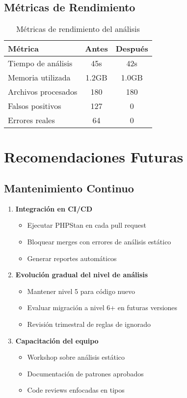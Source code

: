 \documentclass[12pt,a4paper]{article}
\begin{document}
\subsection{Métricas de Rendimiento}

\begin{table}[h]
\centering
\begin{tabular}{@{}lcc@{}}
\toprule
\textbf{Métrica} & \textbf{Antes} & \textbf{Después} \\
\midrule
Tiempo de análisis & 45s & 42s \\
Memoria utilizada & 1.2GB & 1.0GB \\
Archivos procesados & 180 & 180 \\
Falsos positivos & 127 & 0 \\
Errores reales & 64 & 0 \\
\bottomrule
\end{tabular}
\caption{Métricas de rendimiento del análisis}
\end{table}

\section{Recomendaciones Futuras}

\subsection{Mantenimiento Continuo}

\begin{enumerate}
    \item \textbf{Integración en CI/CD}
    \begin{itemize}
        \item Ejecutar PHPStan en cada pull request
        \item Bloquear merges con errores de análisis estático
        \item Generar reportes automáticos
    \end{itemize}

    \item \textbf{Evolución gradual del nivel de análisis}
    \begin{itemize}
        \item Mantener nivel 5 para código nuevo
        \item Evaluar migración a nivel 6+ en futuras versiones
        \item Revisión trimestral de reglas de ignorado
    \end{itemize}

    \item \textbf{Capacitación del equipo}
    \begin{itemize}
        \item Workshop sobre análisis estático
        \item Documentación de patrones aprobados
        \item Code reviews enfocadas en tipos
    \end{itemize}
\end{enumerate}
\end{document}
